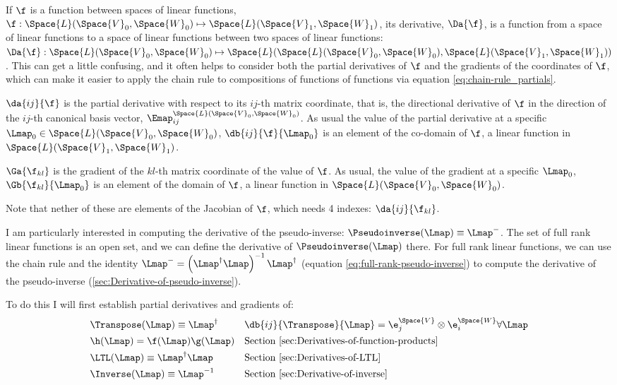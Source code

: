 If $\f$ is a function between spaces of linear functions,
$\f : \Space{L}(\Space{V}_0,\Space{W}_0) \mapsto \Space{L}(\Space{V}_1,\Space{W}_1)$,
its derivative, $\Da{\f}$,
is a function from a space of linear functions
to a space of linear functions between two
spaces of linear functions:
$\Da{\f} : \Space{L}(\Space{V}_0,\Space{W}_0) \mapsto
\Space{L}(\Space{L}(\Space{V}_0,\Space{W}_0), \Space{L}(\Space{V}_1,\Space{W}_1))$.
This can get a little confusing,
and it often helps to consider both the partial derivatives of $\f$
and the gradients of the coordinates of $\f$,
which can make it easier to apply the chain rule to
compositions of functions of functions via equation \ref{eq:chain-rule_partials}.

$\da{ij}{\f}$ is the partial derivative with respect to its $ij$-th matrix coordinate,
that is, the directional derivative of $\f$ in the direction
of the $ij$-th canonical basis vector, $\Emap_{ij}^{\Space{L}(\Space{V}_0,\Space{W}_0)}$.
As usual the value of the partial derivative at a specific
$\Lmap_0 \in  \Space{L}(\Space{V}_0,\Space{W}_0)$,
$\db{ij}{\f}{\Lmap_0}$ is an element of the co-domain of $\f$,
a linear function in  $\Space{L}(\Space{V}_1,\Space{W}_1)$.

$\Ga{\f_{kl}}$ is the gradient of the $kl$-th matrix coordinate of the value of $\f$.
As usual, the value of the gradient at a specific $\Lmap_0$,
$\Gb{\f_{kl}}{\Lmap_0}$ is an element of the domain of $\f$,
a linear function in $\Space{L}(\Space{V}_0,\Space{W}_0)$.

Note that nether of these are elements of the Jacobian of $\f$,
which needs 4 indexes: $\da{ij}{\f_{kl}}$.

I am particularly interested in computing the derivative of the
pseudo-inverse: $\Pseudoinverse(\Lmap) \equiv \Lmap^{-}$.
The set of full rank linear functions is an open set,
and we can define the derivative of $\Pseudoinverse(\Lmap)$ there.
For full rank linear functions,
we can use the chain rule and the identity
$\Lmap^{-} = \left( \Lmap^{\dagger} \Lmap \right)^{-1} \Lmap^{\dagger}$
(equation \ref{eq:full-rank-pseudo-inverse})
to compute the derivative of the pseudo-inverse
(\autoref{sec:Derivative-of-pseudo-inverse}).

To do this I will first establish partial derivatives and gradients of:
\begin{equation}
\begin{aligned}
\label{eq:transpose-derivative}
&\Transpose(\Lmap) \equiv \Lmap^{\dagger}
&&\db{ij}{\Transpose}{\Lmap} =  \e_j^{\Space{V}} \otimes \e_i^{\Space{W}}
\forall \Lmap
\\
&\h( \Lmap ) = \f ( \Lmap ) \g ( \Lmap )
&&\text{Section~\ref{sec:Derivatives-of-function-products} }
\\
&\LTL(\Lmap) \equiv \Lmap^{\dagger} \Lmap
&&\text{Section~\ref{sec:Derivatives-of-LTL} }
\\
&\Inverse(\Lmap) \equiv \Lmap^{-1}
&&\text{Section~\ref{sec:Derivative-of-inverse} }
\end{aligned}
\end{equation}


